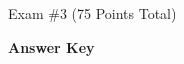 \documentclass{article}
\begin{document}
\begin{EXAM}






\end{EXAM}

\begin{center}
\Large Exam \#3 (75 Points Total) \begin{KEY}\textbf{Answer Key}\end{KEY}
\end{center}
\normalsize
\bigskip
\end{document}
